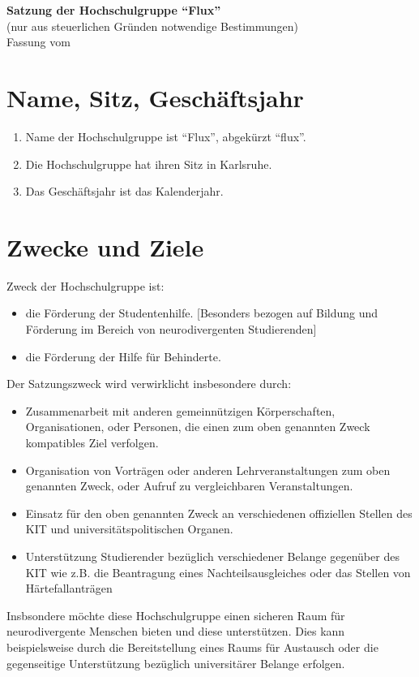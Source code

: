 \documentclass[11pt]{article}
\begin{document}
\begin{center}
	\Large
	\textbf{
		Satzung der Hochschulgruppe ``Flux''}\\
	\normalsize
	(nur aus steuerlichen Gründen notwendige Bestimmungen)\\
	\vspace{10mm}
	Fassung vom 
	\vspace{10mm}
\end{center}

\section{Name, Sitz, Geschäftsjahr}
\begin{enumerate}
	\item Name der Hochschulgruppe ist ``Flux'', abgekürzt ``flux''.
	\item Die Hochschulgruppe hat ihren Sitz in Karlsruhe.
	\item Das Geschäftsjahr ist das Kalenderjahr.
\end{enumerate}
\section{Zwecke und Ziele}
\label{zweck}
Zweck der Hochschulgruppe ist:
\begin{itemize}
	\item die Förderung der Studentenhilfe. [Besonders bezogen auf Bildung und Förderung im Bereich von neurodivergenten Studierenden]
	\item die Förderung der Hilfe für Behinderte.
\end{itemize}
Der Satzungszweck wird verwirklicht insbesondere durch:
\begin{itemize}
	\item Zusammenarbeit mit anderen gemeinnützigen Körperschaften, Organisationen, oder Personen, die einen zum oben genannten Zweck kompatibles Ziel verfolgen.
	\item Organisation von Vorträgen oder anderen Lehrveranstaltungen zum oben genannten Zweck, oder Aufruf zu vergleichbaren Veranstaltungen.
	\item Einsatz für den oben genannten Zweck an verschiedenen offiziellen Stellen des KIT und universitätspolitischen Organen.
	\item Unterstützung Studierender bezüglich verschiedener Belange gegenüber des KIT wie z.B. die Beantragung eines Nachteilsausgleiches oder das Stellen von Härtefallanträgen
\end{itemize}
Insbsondere möchte diese Hochschulgruppe einen sicheren Raum für neurodivergente Menschen bieten und diese unterstützen. Dies kann beispielsweise durch die Bereitstellung eines Raums für Austausch oder die gegenseitige Unterstützung bezüglich universitärer Belange erfolgen.
\end{document}
